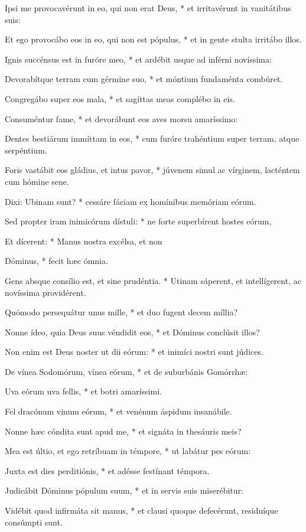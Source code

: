 Ipsi me provocavérunt in eo, qui non erat Deus, * et irritavérunt in vanitátibus suis:

Et ego provocábo eos in eo, qui non est pópulus, * et in gente stulta irritábo illos.

Ignis succénsus est in furóre meo, * et ardébit usque ad inférni novíssima:

Devorabítque terram cum gérmine suo, * et móntium fundaménta combúret.

Congregábo super eos mala, * et sagíttas meas complébo in eis.

Consuméntur fame, * et devorábunt eos aves morsu amaríssimo:

Dentes bestiárum immíttam in eos, * cum furóre trahéntium super terram, atque serpéntium.

Foris vastábit eos gládius, et intus pavor, * júvenem simul ac vírginem, lacténtem cum hómine sene.

Dixi: Ubinam sunt? * cessáre fáciam ex homínibus memóriam eórum.

Sed propter iram inimicórum dístuli: * ne forte superbírent hostes eórum,

Et dícerent: * Manus nostra excélsa, et non

Dóminus, * fecit hæc ómnia.

Gens absque consílio est, et sine prudéntia. * Utinam sáperent, et intellígerent, ac novíssima providérent.

Quómodo persequátur unus mille, * et duo fugent decem míllia?

Nonne ídeo, quia Deus suus véndidit eos, * et Dóminus conclúsit illos?

Non enim est Deus noster ut dii eórum: * et inimíci nostri sunt júdices.

De vínea Sodomórum, vínea eórum, * et de suburbánis Gomórrhæ:

Uva eórum uva fellis, * et botri amaríssimi.

Fel dracónum vinum eórum, * et venénum áspidum insanábile.

Nonne hæc cóndita sunt apud me, * et signáta in thesáuris meis?

Mea est últio, et ego retríbuam in témpore, * ut labátur pes eórum:

Juxta est dies perditiónis, * et adésse festínant témpora.

Judicábit Dóminus pópulum suum, * et in servis suis miserébitur:

Vidébit quod infirmáta sit manus, * et clausi quoque defecérunt, residuíque consúmpti sunt.

